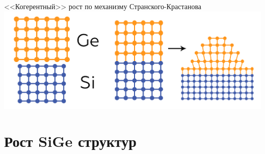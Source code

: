 \documentclass[10pt,pdf,hyperref={unicode}, dvipsnames]{beamer}
\begin{document}
\begin{frame}[t]
\begin{minipage}{0.84\linewidth}
		<<Когерентный>> рост по механизму Странского-Крастанова
		\includegraphics[width = \linewidth]{imgs/2st.png}
		
	\end{minipage}
	\vfill
\end{frame}

\section{Рост SiGe структур}
\end{document}
